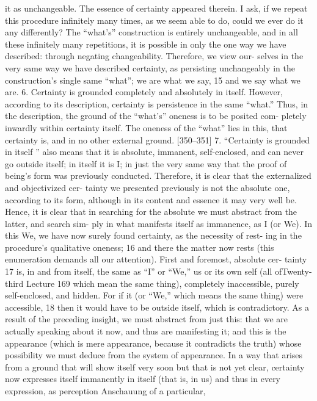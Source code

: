 it as unchangeable. The essence of certainty appeared therein. I ask, if we
repeat this procedure infinitely many times, as we seem able to do, could we
ever do it any differently? The “what’s” construction is entirely unchangeable,
and in all these infinitely many repetitions, it is possible in only the one way
we have described: through negating changeability. Therefore, we view our-
selves in the very same way we have described certainty, as persisting
unchangeably in the construction’s single same “what”; we are what we say, 15
and we say what we are.
6. Certainty is grounded completely and absolutely in itself. However,
according to its description, certainty is persistence in the same “what.” Thus,
in the description, the ground of the “what’s” oneness is to be posited com-
pletely inwardly within certainty itself. The oneness of the “what” lies in this,
that certainty is, and in no other external ground.
[350–351] 7. “Certainty is grounded in itself ” also means that it is
absolute, immanent, self-enclosed, and can never go outside itself; in itself it
is I; in just the very same way that the proof of being’s form was previously
conducted. Therefore, it is clear that the externalized and objectivized cer-
tainty we presented previously is not the absolute one, according to its form,
although in its content and essence it may very well be. Hence, it is clear that
in searching for the absolute we must abstract from the latter, and search sim-
ply in what manifests itself as immanence, as I (or We).
In this We, we have now surely found certainty, as the necessity of rest-
ing in the procedure’s qualitative oneness; 16 and there the matter now rests
(this enumeration demands all our attention). First and foremost, absolute cer-
tainty 17 is, in and from itself, the same as “I” or “We,” us or its own self (all ofTwenty-third Lecture
169
which mean the same thing), completely inaccessible, purely self-enclosed,
and hidden. For if it (or “We,” which means the same thing) were accessible, 18
then it would have to be outside itself, which is contradictory. As a result of
the preceding insight, we must abstract from just this: that we are actually
speaking about it now, and thus are manifesting it; and this is the appearance
(which is mere appearance, because it contradicts the truth) whose possibility
we must deduce from the system of appearance.
In a way that arises from a ground that will show itself very soon but
that is not yet clear, certainty now expresses itself immanently in itself (that is,
in us) and thus in every expression, as perception {Anschauung} of a particular,
